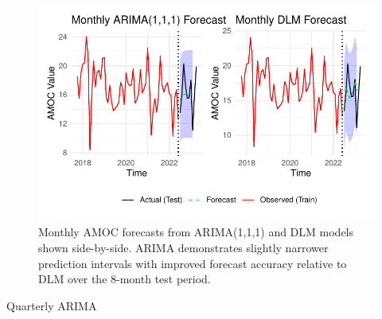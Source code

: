 \documentclass[
  11pt,
]{article}
\begin{document}
\begin{figure}[H]

{\centering \includegraphics{project_files/figure-pdf/fig-monthlyforecast-1.pdf}

}

\caption{Monthly AMOC forecasts from ARIMA(1,1,1) and DLM models shown
side-by-side. ARIMA demonstrates slightly narrower prediction intervals
with improved forecast accuracy relative to DLM over the 8-month test
period.}

\end{figure}%

Quarterly ARIMA
\end{document}
